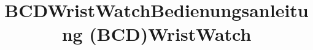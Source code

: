 \documentclass[12pt,a4paper,final]{article}
\title{BCDWristWatch}
\date{\vspace{-10ex}}
\begin{document}
\title{Bedienungsanleitung (BCD)WristWatch}
\author{}
\maketitle


\end{document}
